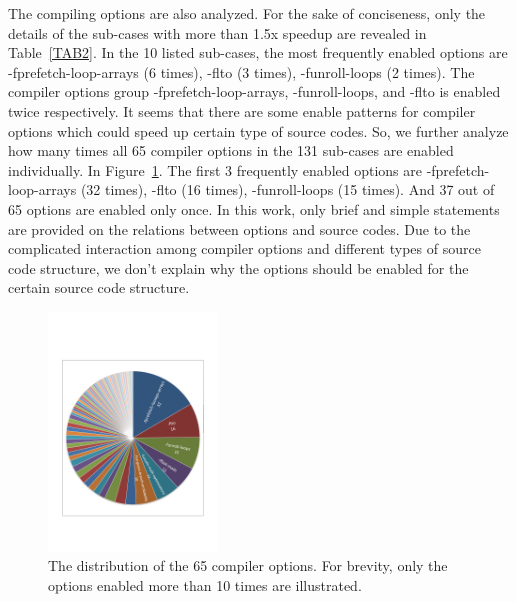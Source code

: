 \documentclass[bst/sn-mathphys]{sn-jnl}%
\theoremstyle{thmstyleone}%
\theoremstyle{thmstyletwo}%
\theoremstyle{thmstylethree}%
\begin{document}
The compiling options are also analyzed. For the sake of conciseness, only the 
details of the sub-cases with more than 1.5x speedup are revealed in 
Table~\ref{TAB2}. In the 10 listed sub-cases, the most frequently enabled 
options are -fprefetch-loop-arrays (6 times), -flto (3 times), -funroll-loops 
(2 times). The compiler options group {-fprefetch-loop-arrays, -funroll-loops}, 
and {-flto} is enabled twice respectively. It seems that there are some enable 
patterns for compiler options which could speed up certain type of source 
codes. So, we further analyze how many times all 65 compiler options in the 131 
sub-cases are enabled individually. In Figure~\ref{FIG11}. The first 3 
frequently enabled options are -fprefetch-loop-arrays (32 times), -flto (16 
times), -funroll-loops (15 times). And 37 out of 65 options are enabled only 
once. In this work, only brief and simple statements are provided on the 
relations between options and source codes. Due to the complicated interaction 
among compiler options and different types of source code structure, we don’t 
explain why the options should be enabled for the certain source code 
structure.

\begin{figure}[h]%
\centering
\includegraphics[width=0.4\textwidth]{fig/fig11.pdf}
\caption{The distribution of the 65 compiler options. For brevity, only the 
options enabled more than 10 times are illustrated.}\label{FIG11}
\end{figure}
\end{document}
